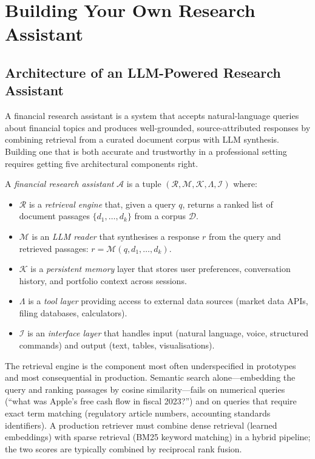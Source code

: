 \section{Building Your Own Research Assistant}
\label{sec:af-research-assistant}

\begin{context}

\subsection{Architecture of an LLM-Powered Research Assistant}
\label{subsec:af-ra-architecture}

A financial research assistant is a system that accepts natural-language queries about financial topics and produces well-grounded, source-attributed responses by combining retrieval from a curated document corpus with LLM synthesis. Building one that is both accurate and trustworthy in a professional setting requires getting five architectural components right.

\begin{definition}
\label{def:ra-architecture}
A \emph{financial research assistant} $\mathcal{A}$ is a tuple $(\mathcal{R}, \mathcal{M}, \mathcal{K}, \Lambda, \mathcal{I})$ where:
\begin{itemize}
  \item $\mathcal{R}$ is a \emph{retrieval engine} that, given a query $q$, returns a ranked list of document passages $\{d_1, \ldots, d_k\}$ from a corpus $\mathcal{D}$.
  \item $\mathcal{M}$ is an \emph{LLM reader} that synthesises a response $r$ from the query and retrieved passages: $r = \mathcal{M}(q, d_1, \ldots, d_k)$.
  \item $\mathcal{K}$ is a \emph{persistent memory} layer that stores user preferences, conversation history, and portfolio context across sessions.
  \item $\Lambda$ is a \emph{tool layer} providing access to external data sources (market data APIs, filing databases, calculators).
  \item $\mathcal{I}$ is an \emph{interface layer} that handles input (natural language, voice, structured commands) and output (text, tables, visualisations).
\end{itemize}
\end{definition}

The retrieval engine is the component most often underspecified in prototypes and most consequential in production. Semantic search alone---embedding the query and ranking passages by cosine similarity---fails on numerical queries (``what was Apple's free cash flow in fiscal 2023?'') and on queries that require exact term matching (regulatory article numbers, accounting standards identifiers). A production retriever must combine dense retrieval (learned embeddings) with sparse retrieval (BM25 keyword matching) in a hybrid pipeline; the two scores are typically combined by reciprocal rank fusion.


\end{context}
